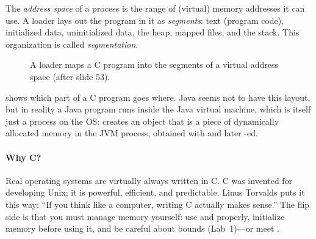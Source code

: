 \begin{definition}
  The \emph{address space} of a process is the range of (virtual) memory addresses it can use. A loader lays out the program in it as \emph{segments}: text (program code), initialized data, uninitialized data, the heap, mapped files, and the stack. This organization is called \emph{segmentation}.
\end{definition}

\begin{figure}[htbp]
\centering
{}
\caption{A loader maps a C program into the segments of a virtual address space (after slide 53).}
\label{fig:layout}
\end{figure}

 shows which part of a C program goes where. Java seems not to have this layout, but in reality a Java program runs inside the Java virtual machine, which is itself just a process on the OS:  creates an object that is a piece of dynamically allocated memory in the JVM process, obtained with  and later -ed.

\paragraph{Why C?} Real operating systems are virtually always written in C. C was invented for developing Unix; it is powerful, efficient, and predictable. Linus Torvalds puts it this way: ``If you think like a computer, writing C actually makes sense.'' The flip side is that you must manage memory yourself: use  and  properly, initialize memory before using it, and be careful about bounds (Lab~1)---or meet .

